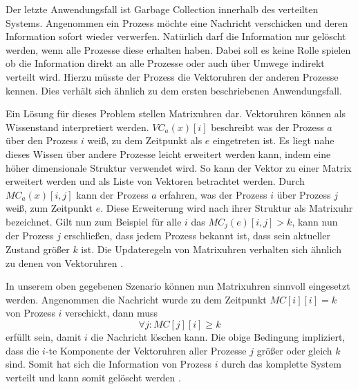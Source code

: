 
Der letzte Anwendungsfall ist Garbage Collection innerhalb des verteilten Systems.
Angenommen ein Prozess möchte eine Nachricht verschicken und deren Information sofort wieder verwerfen.
Natürlich darf die Information nur gelöscht werden, wenn alle Prozesse diese erhalten haben.
Dabei soll es keine Rolle spielen ob die Information direkt an alle Prozesse oder auch über Umwege indirekt verteilt wird.
Hierzu müsste der Prozess die Vektoruhren der anderen Prozesse kennen.
Dies verhält sich ähnlich zu dem ersten beschriebenen Anwendungsfall.

Ein Lösung für dieses Problem stellen Matrixuhren dar.
Vektoruhren können als Wissenstand interpretiert werden.
$VC_a(x)[i]$ beschreibt was der Prozess $a$ über den Prozess $i$ weiß, zu dem Zeitpunkt als $e$ eingetreten ist.
Es liegt nahe dieses Wissen über andere Prozesse leicht erweitert werden kann, indem eine höher dimensionale Struktur verwendet wird.
So kann der Vektor zu einer Matrix erweitert werden und als Liste von Vektoren betrachtet werden.
Durch $MC_a(x)[i,j]$ kann der Prozess $a$ erfahren, was der Prozess $i$ über Prozess $j$ weiß, zum Zeitpunkt $e$.
Diese Erweiterung wird nach ihrer Struktur als Matrixuhr bezeichnet.
Gilt nun zum Beispiel für alle $i$ das $MC_j(e)[i, j] > k$, kann nun der Prozess $j$ erschließen, dass jedem Prozess bekannt ist, dass sein aktueller Zustand größer $k$ ist.
Die Updateregeln von Matrixuhren verhalten sich ähnlich zu denen von Vektoruhren \cite{garg2005concurrent}.

In unserem oben gegebenen Szenario können nun Matrixuhren sinnvoll eingesetzt werden.
Angenommen die Nachricht wurde zu dem Zeitpunkt $MC[i][i]=k$ von Prozess $i$ verschickt, dann muss
\begin{equation*}
\forall j \colon MC[j][i] \geq k
\end{equation*}
erfüllt sein, damit $i$ die Nachricht löschen kann.
Die obige Bedingung impliziert, dass die $i$-te Komponente der Vektoruhren aller Prozesse $j$ größer oder gleich $k$ sind.
Somit hat sich die Information von Prozess $i$ durch das komplette System verteilt und kann somit gelöscht werden \cite{garg2005concurrent}.


